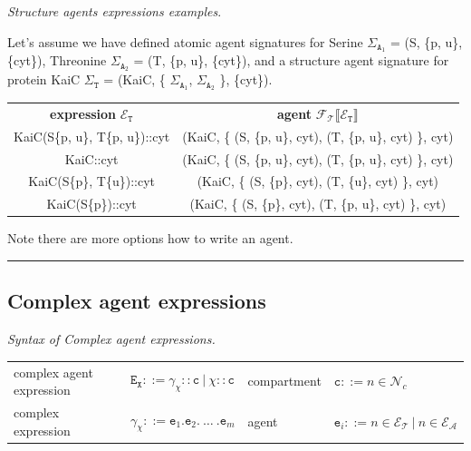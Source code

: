 \documentclass{elsarticle}
\newcommand{\choice}{|}
\begin{document}
\begin{example}\label{structure_expression_examples}
\textit{Structure agents expressions examples}.

Let's assume we have defined atomic agent signatures for Serine $\Sigma_{\mathtt{A}_1}$ = (S, \{p, u\}, \{cyt\}), Threonine $\Sigma_{\mathtt{A}_2}$ = (T, \{p, u\}, \{cyt\}), and a structure agent signature for protein KaiC $\Sigma_\mathtt{T}$ = (KaiC, \{ $\Sigma_{\mathtt{A}_1}$, $\Sigma_{\mathtt{A}_2}$ \}, \{cyt\}).

\begin{center}
\begin{tabular}{ c | c }
\textbf{expression} $\mathcal{E}_\mathtt{T}$ & \textbf{agent} $\mathcal{F}_\mathcal{T} \llbracket \mathcal{E}_\mathtt{T} \rrbracket$ \\
KaiC(S\{p, u\}, T\{p, u\})::cyt & (KaiC, \{ (S, \{p, u\}, cyt), (T, \{p, u\}, cyt) \}, cyt) \\
KaiC::cyt & (KaiC, \{ (S, \{p, u\}, cyt), (T, \{p, u\}, cyt) \}, cyt) \\
KaiC(S\{p\}, T\{u\})::cyt & (KaiC, \{ (S, \{p\}, cyt), (T, \{u\}, cyt) \}, cyt) \\
KaiC(S\{p\})::cyt & (KaiC, \{ (S, \{p\}, cyt), (T, \{p, u\}, cyt) \}, cyt) \\
\end{tabular}
\end{center}

Note there are more options how to write an agent.
\end{example}


\noindent\rule{\textwidth}{1pt}

\subsection{Complex agent expressions}

\begin{definition}\label{complex_syntax}
\textit{Syntax of Complex agent expressions.}
\begin{center}
{\small
\begin{tabular}{ l l l l }
 complex agent expression & $\mathtt{E}_\mathtt{X}::=\gamma_\chi::\mathtt{c} ~|~ \chi::\mathtt{c}$ & compartment & $\mathtt{c} ::= n \in \mathcal{N}_{c}$\\
 complex expression & $\gamma_\chi ::= \mathtt{e}_1.\mathtt{e}_2.~\ldots~.\mathtt{e}_m$ & agent & $\mathtt{e}_i ::= n \in \mathcal{E}_\mathcal{T}~\choice~n \in \mathcal{E}_\mathcal{A}$
\end{tabular}
}
\end{center}
\end{definition}
\end{document}
